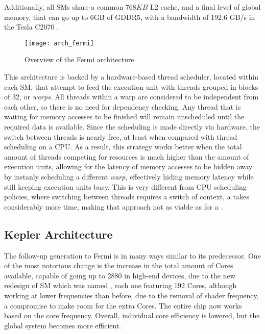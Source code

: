 \documentclass[main.tex]{subfiles}
\begin{document}
Additionally, all \acsp{SM} share a common $768KB$ L2 cache, and a final level of global memory, that can go up to 6GB of GDDR5, with a bandwidth of 192.6 GB/s in the Tesla C2070 \cite{NVIDIA:fermi}.

\begin{figure}[!htp]
  \centering
  \texttt{[image: arch\_fermi]}
  \caption{Overview of the Fermi architecture \label{fig:fermi}}
\end{figure}

This architecture is backed by a hardware-based thread scheduler, located within each \acs{SM}, that attempt to feed the execution unit with threads grouped in blocks of 32, or \textit{warps}. All threads within a warp are considered to be independent from each other, so there is no need for dependency checking. Any thread that is waiting for memory accesses to be finished will remain unscheduled until the required data is available. Since the scheduling is made directly via hardware, the switch between threads is nearly free, at least when compared with thread scheduling on a \acs{CPU}. As a result, this strategy works better when the total amount of threads competing for resources is much higher than the amount of execution units, allowing for the latency of memory accesses to be hidden away by instanly scheduling a different \textit{warp}, effectively hiding memory latency while still keeping execution units busy. This is very different from \acs{CPU} scheduling policies, where switching between threads requires a switch of context, a takes considerably more time, making that approach not as viable as for a \gpus.



\subsection{\nvidia Kepler Architecture}

The follow-up generation to Fermi is in many ways similar to its predecessor. One of the most notorious change is the increase in the total amount of \cuda Cores available, capable of going up to 2880 in high-end devices, due to the new redesign of \acl{SM} which was named \smx, each one featuring 192 \cuda Cores, although working at lower frequencies than before, due to the removal of shader frequency, a compromise to make room for the extra \cuda Cores. The entire chip now works based on the core frequency. Overall, individual core efficiency is lowered, but the global system becomes more efficient.
\end{document}
